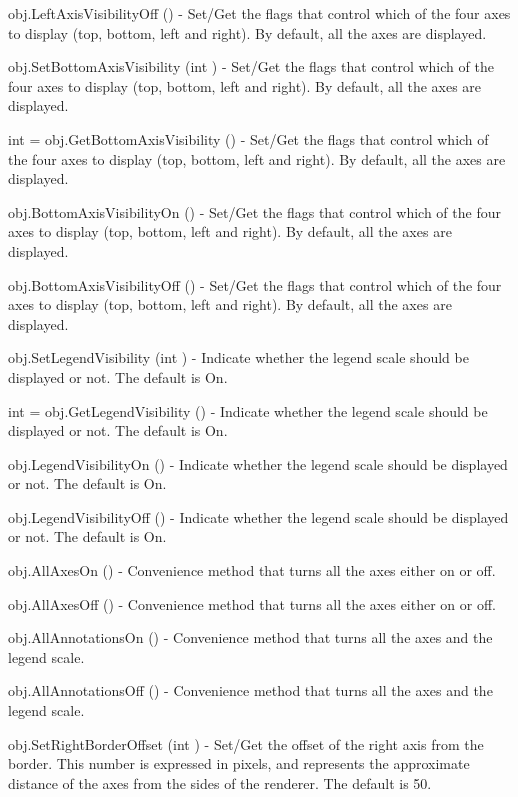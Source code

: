 \begin{DoxyItemize}
\item {\ttfamily obj.\-Left\-Axis\-Visibility\-Off ()} -\/ Set/\-Get the flags that control which of the four axes to display (top, bottom, left and right). By default, all the axes are displayed.  
\item {\ttfamily obj.\-Set\-Bottom\-Axis\-Visibility (int )} -\/ Set/\-Get the flags that control which of the four axes to display (top, bottom, left and right). By default, all the axes are displayed.  
\item {\ttfamily int = obj.\-Get\-Bottom\-Axis\-Visibility ()} -\/ Set/\-Get the flags that control which of the four axes to display (top, bottom, left and right). By default, all the axes are displayed.  
\item {\ttfamily obj.\-Bottom\-Axis\-Visibility\-On ()} -\/ Set/\-Get the flags that control which of the four axes to display (top, bottom, left and right). By default, all the axes are displayed.  
\item {\ttfamily obj.\-Bottom\-Axis\-Visibility\-Off ()} -\/ Set/\-Get the flags that control which of the four axes to display (top, bottom, left and right). By default, all the axes are displayed.  
\item {\ttfamily obj.\-Set\-Legend\-Visibility (int )} -\/ Indicate whether the legend scale should be displayed or not. The default is On.  
\item {\ttfamily int = obj.\-Get\-Legend\-Visibility ()} -\/ Indicate whether the legend scale should be displayed or not. The default is On.  
\item {\ttfamily obj.\-Legend\-Visibility\-On ()} -\/ Indicate whether the legend scale should be displayed or not. The default is On.  
\item {\ttfamily obj.\-Legend\-Visibility\-Off ()} -\/ Indicate whether the legend scale should be displayed or not. The default is On.  
\item {\ttfamily obj.\-All\-Axes\-On ()} -\/ Convenience method that turns all the axes either on or off.  
\item {\ttfamily obj.\-All\-Axes\-Off ()} -\/ Convenience method that turns all the axes either on or off.  
\item {\ttfamily obj.\-All\-Annotations\-On ()} -\/ Convenience method that turns all the axes and the legend scale.  
\item {\ttfamily obj.\-All\-Annotations\-Off ()} -\/ Convenience method that turns all the axes and the legend scale.  
\item {\ttfamily obj.\-Set\-Right\-Border\-Offset (int )} -\/ Set/\-Get the offset of the right axis from the border. This number is expressed in pixels, and represents the approximate distance of the axes from the sides of the renderer. The default is 50.  

\end{DoxyItemize}
